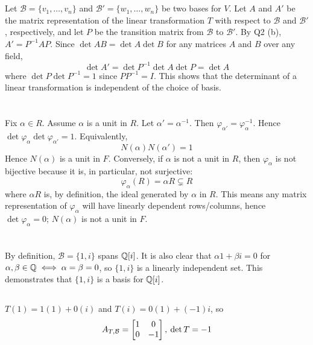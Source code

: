 \documentclass[12pt]{article}
\begin{document}
\section{} 
Let $\mathcal{B} = \{v_1, \ldots, v_n\}$ and $\mathcal{B'} = \{w_1, \ldots, w_n\}$ be two bases for $V$. 
Let $A$ and $A'$ be the matrix representation of the linear transformation $T$ with respect to $\mathcal{B}$ and $\mathcal{B'}$, respectively, and let $P$ be the transition matrix from $\mathcal{B}$ to $\mathcal{B'}$. 
By Q2 (b), $A' = P^{-1}AP$. 
Since $\det{AB} = \det{A} \det{B}$ for any matrices $A$ and $B$ over any field, 
$$\det{A'} = \det{P^{-1}} \det{A} \det{P} = \det{A}$$
where $\det{P}\det{P^{-1}} = 1$ since $P P^{-1} = I$. 
This shows that the determinant of a linear transformation is independent of the choice of basis. 

\section{} 
Fix $\alpha \in R$. 
Assume $\alpha$ is a unit in $R$.
Let $\alpha' = \alpha^{-1}$. 
Then $\varphi_{\alpha'} = \varphi_{\alpha}^{-1}$. 
Hence $\det \varphi_{\alpha} \det \varphi_{\alpha'} = 1$.
Equivalently, 
$$N(\alpha) N(\alpha') = 1$$
Hence $N(\alpha)$ is a unit in $F$. 
Conversely, if $\alpha$ is not a unit in $R$, then $\varphi_{\alpha}$ is not bijective because it is, in particular, not surjective: 
$$\varphi_{\alpha}(R) = \alpha R \subsetneq R$$
where $\alpha R$ is, by definition, the ideal generated by $\alpha$ in $R$. 
This means any matrix representation of $\varphi_{\alpha}$ will have linearly dependent rows/columns, hence $\det \varphi_\alpha = 0$;
$N(\alpha)$ is not a unit in $F$. 

\section{} 
\subsection{}
By definition, $\mathcal{B} = \{1, i\}$ spans $\mathbb{Q}[i]$. 
It is also clear that $\alpha 1 + \beta i = 0$ for $\alpha, \beta \in \mathbb{Q} \iff \alpha = \beta = 0$, so $\{1, i\}$ is a linearly independent set.  
This demonstrates that $\{1, i\}$ is a basis for $\mathbb{Q}[i]$. 

\subsection{}
$T(1) = 1(1) + 0(i)$ and $T(i) = 0(1) + (-1)i$, so 
$$A_{T, \mathcal{B}} = \begin{bmatrix}1 & 0 \\ 0 & -1\end{bmatrix}, \: \det T = -1$$ 
\end{document}
